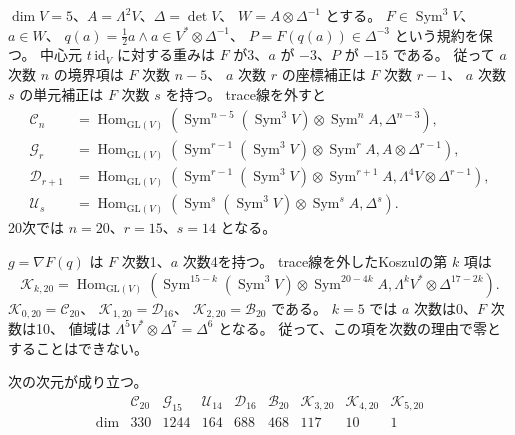 $\dim V=5$、$A=\Lambda^2V$、$\Delta=\det V$、
$W=A\otimes\Delta^{-1}$ とする。
$F\in\operatorname{Sym}^3V$、$a\in W$、
$q(a)=\tfrac12a\wedge a\in V^*\otimes\Delta^{-1}$、
$P=F(q(a))\in\Delta^{-3}$ という規約を保つ。
中心元 $t\,\mathrm{id}_V$ に対する重みは
$F$ が3、$a$ が $-3$、$P$ が $-15$ である。
従って $a$ 次数 $n$ の境界項は $F$ 次数 $n-5$、
$a$ 次数 $r$ の座標補正は $F$ 次数 $r-1$、
$a$ 次数 $s$ の単元補正は $F$ 次数 $s$ を持つ。
trace線を外すと
\begin{align*}
\mathcal C_n&=\operatorname{Hom}_{\mathrm{GL}(V)}
 \left(\operatorname{Sym}^{n-5}(\operatorname{Sym}^3V)
 \otimes\operatorname{Sym}^n A,\Delta^{n-3}\right),\\
\mathcal G_r&=\operatorname{Hom}_{\mathrm{GL}(V)}
 \left(\operatorname{Sym}^{r-1}(\operatorname{Sym}^3V)
 \otimes\operatorname{Sym}^r A,A\otimes\Delta^{r-1}\right),\\
\mathcal D_{r+1}&=\operatorname{Hom}_{\mathrm{GL}(V)}
 \left(\operatorname{Sym}^{r-1}(\operatorname{Sym}^3V)
 \otimes\operatorname{Sym}^{r+1}A,\Lambda^4V\otimes\Delta^{r-1}\right),\\
\mathcal U_s&=\operatorname{Hom}_{\mathrm{GL}(V)}
 \left(\operatorname{Sym}^{s}(\operatorname{Sym}^3V)
 \otimes\operatorname{Sym}^{s}A,\Delta^{s}\right).
\end{align*}
20次では $n=20$、$r=15$、$s=14$ となる。

$g=\nabla F(q)$ は $F$ 次数1、$a$ 次数4を持つ。
trace線を外したKoszulの第 $k$ 項は
\begin{equation}\label{eq:v15-koszul-term}
\mathcal K_{k,20}=
\operatorname{Hom}_{\mathrm{GL}(V)}
\left(\operatorname{Sym}^{15-k}(\operatorname{Sym}^3V)
 \otimes\operatorname{Sym}^{20-4k} A,
 \Lambda^k V^*\otimes\Delta^{17-2k}\right).
\end{equation}
$\mathcal K_{0,20}=\mathcal C_{20}$、
$\mathcal K_{1,20}=\mathcal D_{16}$、
$\mathcal K_{2,20}=\mathcal B_{20}$ である。
$k=5$ では $a$ 次数は0、$F$ 次数は10、
値域は $\Lambda^5V^*\otimes\Delta^7=\Delta^6$ となる。
従って、この項を次数の理由で零とすることはできない。

\begin{proposition}[20次の厳密次元]\label{prop:v15-twentieth-dimensions}
次の次元が成り立つ。
\[
\begin{array}{c|rrrrrrrr}
 &\mathcal C_{20}&\mathcal G_{15}&\mathcal U_{14}&\mathcal D_{16}
 &\mathcal B_{20}&\mathcal K_{3,20}&\mathcal K_{4,20}&\mathcal K_{5,20}\\\hline
\dim&330&1244&164&688&468&117&10&1
\end{array}
\]
\end{proposition}

